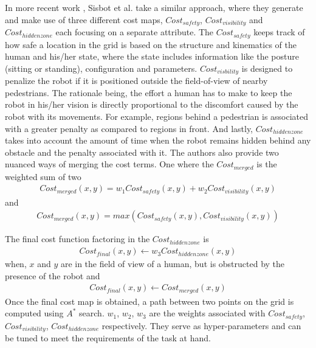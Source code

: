 In more recent work \cite{sisbot_human_2007}, Sisbot et al. take a similar approach, where they generate and make use of three different cost maps, $Cost_{safety}$, $Cost_{visibility}$ and $Cost_{hidden zone}$ each focusing on a separate attribute.
The $Cost_{safety}$ keeps track of how safe a location in the grid is based on the structure and kinematics of the human and his/her state, where the state includes information like the posture (sitting or standing), configuration and parameters.
$Cost_{visbility}$ is designed to penalize the robot if it is positioned outside the field-of-view of nearby pedestrians. 
The rationale being, the effort a human has to make to keep the robot in his/her vision is directly proportional to the discomfort caused by the robot with its movements. For example, regions behind a pedestrian is associated with a greater penalty as compared to regions in front.
And lastly, $Cost_{hidden zone}$ takes into account the amount of time when the robot remains hidden behind any obstacle and the penalty associated with it. 
The authors also provide two nuanced ways of merging the cost terms. One where the $Cost_{merged}$ is the weighted sum of two
\begin{align}
Cost_{merged}(x,y) = w_{1}Cost_{safety}(x,y) + w_{2}Cost_{visibility}(x,y)
\end{align}
and 
\begin{align}
Cost_{merged}(x,y) = max(Cost_{safety}(x,y), Cost_{visibility}(x,y))
\end{align}

The final cost function factoring in the $Cost_{hidden zone}$ is
\begin{align}
Cost_{final}(x,y) \leftarrow w_{3} Cost_{hidden zone}(x,y)
\end{align}
when, $x$ and $y$ are in the field of view of a human, but is obstructed by the presence of the robot and 
\begin{align}
Cost_{final}(x,y) \leftarrow Cost_{merged}(x,y)
\end{align}
Once the final cost map is obtained, a path between two points on the grid is computed using $A^*$ search. $ w_{1}$, $w_{2}$, $w_{3}$ are the weights associated with $Cost_{safety}$, $Cost_{visibility}$, $Cost_{hidden zone}$ respectively. They serve as hyper-parameters and can be tuned to meet the requirements of the task at hand.

